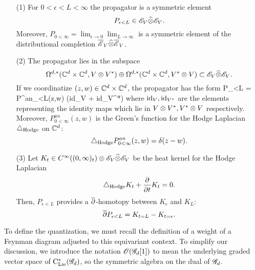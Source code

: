 \begin{enumerate}
\item[(1)] For $0 < \epsilon < L < \infty$ the propagator is a symmetric element
\[
P_{\epsilon < L} \in \mathscr E_V \widehat{\otimes} \mathscr E_V .
\]
Moreover, $P_{0 < \infty} = \lim_{\epsilon \to 0}\lim_{L \to \infty}$ is a symmetric element of the distributional completion $\overline{\mathscr E}_V \widehat{\otimes} \overline{\mathscr E}_V$. 

\item[(2)] 
The propagator lies in the subspace
\[
\Omega^{d,*}(\mathbb C^d \times \mathbb C^d, V \otimes V^*) \oplus \Omega^{d,*}(\mathbb C^d \times \mathbb C^d, V^* \otimes V) \subset \mathscr E_V \widehat{\otimes} \mathscr E_V .
\]
If we coordinatize $(z,w) \in \mathbb C^d \times \mathbb C^d$, the propagator has the form
\beqn
P_{\epsilon<L} = P^{an}_{\epsilon<L}(z,w) \tensor \left({\rm id}_{V} + {\rm id}_{V^*}\right)
\eeqn
where ${\rm id}_V, {\rm id}_{V^*}$ are the elements representing the identity maps which lie in $V \otimes V^*, V^* \otimes V$ respectively. 
Moreover, $P^{an}_{0 < \infty} (z,w)$ is the Green's function for the Hodge Laplacian $\triangle_{\rm Hodge}$ on $\mathbb C^d$:
\[
\triangle_{\rm Hodge} P^{an}_{0<\infty} (z,w) = \delta (z-w) .
\]

\item[(3)] Let $K_t \in C^\infty((0,\infty)_t) \otimes \mathscr E_V \widehat{\otimes} \mathscr E_V$ be the heat kernel for the Hodge Laplacian
\[
\triangle_{\rm Hodge} K_t + \frac{\partial}{\partial t} K_t = 0 .
\]
Then, $P_{\epsilon < L}$ provides a $\overline{\partial}$-homotopy between $K_\epsilon$ and $K_L$:
\[
\overline{\partial} P_{\epsilon < L} = K_{t=L} - K_{t=\epsilon} .
\]
\end{enumerate}


To define the quantization, we must recall the definition of a weight of a Feynman diagram adjusted to this equivariant context.
To simplify our discussion, we introduce the notation $\mathscr O(\mathscr G_d[1])$ to mean the underlying graded vector space of ${\rm C}_{{\rm Lie}}^*(\mathscr G_d)$, so the symmetric algebra on the dual of $\mathscr G_d$. 

